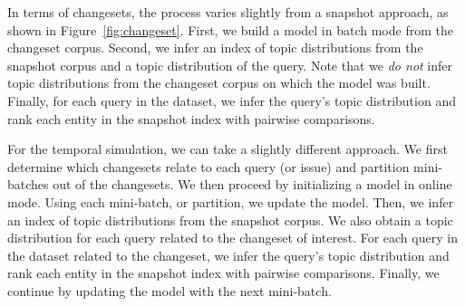 In terms of changesets, the process varies slightly from a snapshot approach, as
shown in Figure~\ref{fig:changeset}.  First, we build a model in batch mode
from the changeset corpus.  Second, we infer an index of topic distributions
from the snapshot corpus and a topic distribution of the query.  Note that we
\emph{do not} infer topic distributions from the changeset corpus on which the
model was built.  Finally, for each query in the dataset, we infer the query's
topic distribution and rank each entity in the snapshot index with pairwise
comparisons.

\begin{comment}
\begin{enumerate}
    \item Build model from the changeset corpus in batch mode
    \item \emph{Do not} infer a $\theta_{Changesets}$
    \item Infer a $\theta_{Snapshot}$ from the snapshot corpus
    \item Infer a  $\theta_{Queries}$ from the query corpus
    \item Classify, or rank, the results from both $\theta$s
\end{enumerate}
\end{comment}


For the temporal simulation, we can take a slightly different approach.  We
first determine which changesets relate to each query (or issue) and partition
mini-batches out of the changesets.  We then proceed by initializing a model in
online mode.  Using each mini-batch, or partition, we update the model.  Then,
we infer an index of topic distributions from the snapshot corpus.  We also
obtain a topic distribution for each query related to the changeset of interest.
For each query in the dataset related to the changeset, we infer the query's
topic distribution and rank each entity in the snapshot index with pairwise
comparisons. Finally, we continue by updating the model with the next
mini-batch.

\begin{comment}
\begin{enumerate}
    \item Initialize a model in online mode
    \item Determine which changesets relate to an issue and partition mini-batches out of the changesets
    \item For each mini-batch:
        \begin{enumerate}
            \item Update the model with mini-batch
            \item Update $\theta_{Snapshot}$ with the new inference of the source code document affected by this changeset
            \item Infer a $\theta_{Query}$ of the query related to the changeset we stopped at
            \item Classify, or rank, the results from both $\theta$s
        \end{enumerate}
\end{enumerate}
\end{comment}

